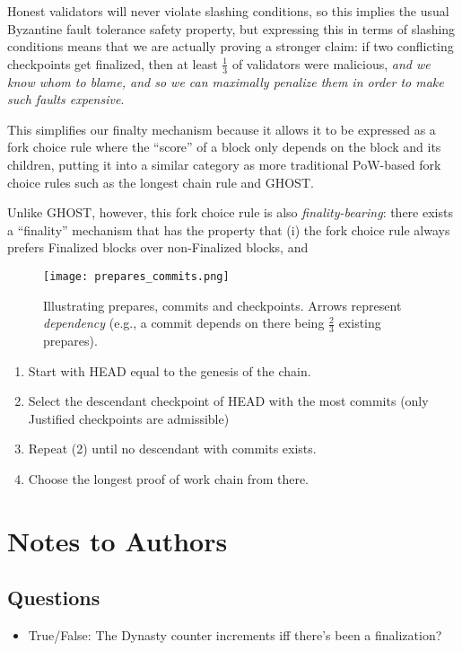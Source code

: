 Honest validators will never violate slashing conditions, so this implies the usual Byzantine fault tolerance safety property, but expressing this in terms of slashing conditions means that we are actually proving a stronger claim: if two conflicting checkpoints get finalized, then at least $\frac{1}{3}$ of validators were malicious, \textit{and we know whom to blame, and so we can maximally penalize them in order to make such faults expensive}.


This simplifies our finalty mechanism because it allows it to be expressed as a fork choice rule where the ``score'' of a block only depends on the block and its children, putting it into a similar category as more traditional PoW-based fork choice rules such as the longest chain rule and GHOST\cite{sompolinsky2013accelerating}.

Unlike GHOST, however, this fork choice rule is also \textit{finality-bearing}: there exists a ``finality'' mechanism that has the property that (i) the fork choice rule always prefers Finalized blocks over non-Finalized blocks, and

\begin{figure}[h!tb]
\centering
    \texttt{[image: prepares\_commits.png]}
    \caption{Illustrating prepares, commits and checkpoints. Arrows represent \textit{dependency} (e.g., a commit depends on there being $\frac{2}{3}$ existing prepares).}
    \label{fig:prepares_and_commits}
\end{figure}


\begin{enumerate}
\item Start with HEAD equal to the genesis of the chain.
\item Select the descendant checkpoint of HEAD with the most commits (only Justified checkpoints are admissible)
\item Repeat (2) until no descendant with commits exists.
\item Choose the longest proof of work chain from there.
\end{enumerate}



\section{Notes to Authors}
\subsection{Questions}
\begin{itemize}
\item True/False: The Dynasty counter increments iff there's been a finalization?
\end{itemize}


